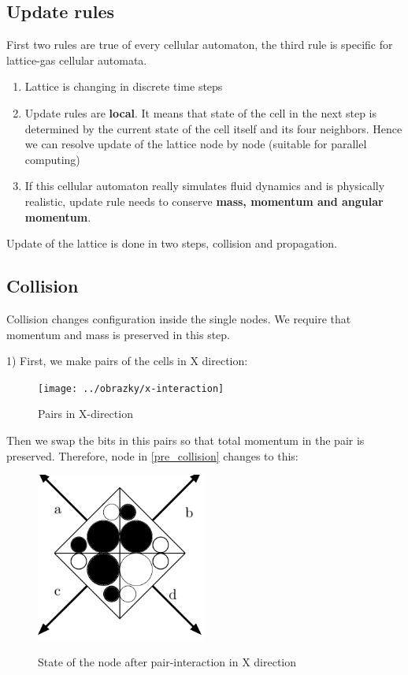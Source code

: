 \subsection{Update rules}
First two rules are true of every cellular automaton, the third rule is specific for lattice-gas cellular automata.

\begin{enumerate}
\item Lattice is changing in discrete time steps
\item Update rules are \textbf{local}. It means that state of the cell in the next step is determined by the current state of the cell itself and its four neighbors. Hence we can resolve update of the lattice node by node (suitable for parallel computing)
\item If this cellular automaton really simulates fluid dynamics and is physically realistic, update rule needs to conserve \textbf{mass, momentum and angular momentum}.
\end{enumerate}

Update of the lattice is done in two steps, collision and propagation.


\subsection{Collision}
Collision changes configuration inside the single nodes. We require that momentum and mass is preserved in this step.

1) First, we make pairs of the cells in X direction:
\begin{figure}[htbp]
 \centering 
 \texttt{[image: ../obrazky/x-interaction]}
 \label{xinter}
 \caption{Pairs in X-direction}
\end{figure}

Then we swap the bits in this pairs so that total momentum in the pair is preserved. Therefore, node in \ref{pre_collision} changes to this:

\begin{figure}[htbp]
 \centering 
 \includegraphics[width=0.5\textwidth]{./img/node_2}
 \label{colision1}
 \caption{State of the node after pair-interaction in X direction}
\end{figure}

